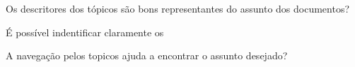 \item Os descritores dos tópicos são bons representantes do assunto dos documentos?
\item É possível indentificar claramente os 
\item A navegação pelos topicos ajuda a encontrar o assunto desejado?







%

%


